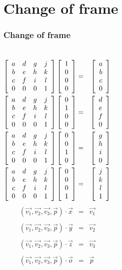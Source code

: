 \documentclass[slidestop,xcolor=pst,dvips]{beamer}
\newcommand{\sect}[1]{
\section{#1}
\begin{frame}[fragile]\frametitle{#1}
}
\begin{document}
\sect{Change of frame}
\begin{columns}
{\small
\begin{eqnarray*}
\mhomo
{a & d & g & j }
{b & e & h & k}
{c & f & i & l}
\vhomo{1\\0\\0}
 &=& \vhomo{a\\b\\c}\\
\mhomo
{a & d & g & j }
{b & e & h & k}
{c & f & i & l}
\vhomo{0\\1\\0}
 &=& \vhomo{d\\e\\f}\\
\mhomo
{a & d & g & j }
{b & e & h & k}
{c & f & i & l}
\vhomo{0\\0\\1}
 &=& \vhomo{g\\h\\i}\\
\mhomo
{a & d & g & j }
{b & e & h & k}
{c & f & i & l}
\phomo{0\\0\\0}
 &=& \phomo{j\\k\\l}\\
\end{eqnarray*}
}
\pause
{}
\begin{eqnarray*}
(\vec{v_1}, \vec{v_2}, \vec{v_3}, \vec{p})\cdot\vec{x} &=& \vec{v_1}\\\\
(\vec{v_1}, \vec{v_2}, \vec{v_3}, \vec{p})\cdot\vec{y} &=& \vec{v_2}\\\\
(\vec{v_1}, \vec{v_2}, \vec{v_3}, \vec{p})\cdot\vec{z} &=& \vec{v_3}\\\\
(\vec{v_1}, \vec{v_2}, \vec{v_3}, \vec{p})\cdot\vec{o} &=& \vec{p}
\end{eqnarray*}
\end{columns}
\end{frame}
\end{document}
